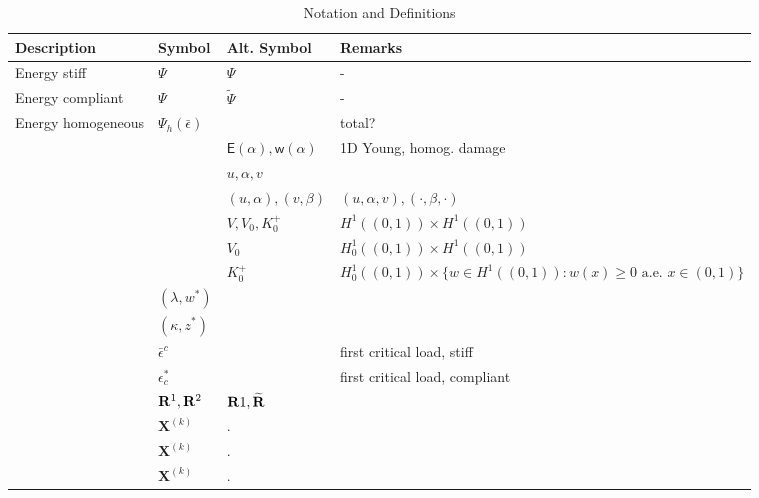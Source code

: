 


\newcommand{\Estiff}{\Psi}
\newcommand{\Ecompl}{\widetilde\Psi}
\newcommand{\subsu}{v}
\newcommand{\homogdiss}{\mathsf{w}}
\newcommand{\soften}{\mathsf{a}}
\newcommand{\damagell}{\ell}
\newcommand{\elastell}{\Lambda}
\newcommand{\stiffratio}{\rho}
\newcommand{\yhom}{y^{\text{hom}}}



\begin{table}[h!]
    \centering
    \begin{tabular}{  m{3.5cm}  m{3cm}  m{2.5cm}  m{6cm}  }
      \hline
      \textbf{Description} & \textbf{Symbol} & \textbf{Alt. Symbol} & \textbf{Remarks} \\
      \hline
      Energy stiff     & $\Psi$ & $\Estiff$ & - \\
      Energy compliant & $\Psi$ & $\Ecompl$ & - \\
      Energy homogeneous & $\Psi_h(\bar\epsilon)$ &  & total? \\
      & & $\mathsf E(\alpha), \homogdiss(\alpha)$ & 1D Young, homog. damage\\
      & & $u, \alpha, v$ & \\
      & & $(u,\alpha), (v, \beta)$ & $(u,\alpha, v), (\cdot, \beta, \cdot)$ \\
      & & $V, V_0, K^+_0$ & $H^1((0,1))\times  H^1((0,1))$\\
      & & $V_0$ & $H^1_0((0,1))\times  H^1((0,1))$\\
      & & $K^+_0$ & $H^1_0((0, 1))\times \{w \in H^1((0, 1)): w(x) \geq 0 \text{ a.e. }x\in (0, 1)\}$\\
      & $(\lambda, w^*)$ &  & \\
      & $(\kappa, z^*)$ &  & \\
      & $\bar \epsilon^c$ &  & first critical load, stiff\\
      & $\epsilon_c^*$ &  & first critical load, compliant \\
      & ${\bf R}^1, {\bf R}^2$ & ${\bf R}1, \widetilde{\bf R}$ & \\
      & $\mathbf{X}^{(k)}$ & $.$ & \\
      & $\mathbf{X}^{(k)}$ & $.$ & \\
      & $\mathbf{X}^{(k)}$ & $.$ & \\
    \end{tabular}
    \caption{Notation and Definitions}
\label{table:notation}
\end{table}

